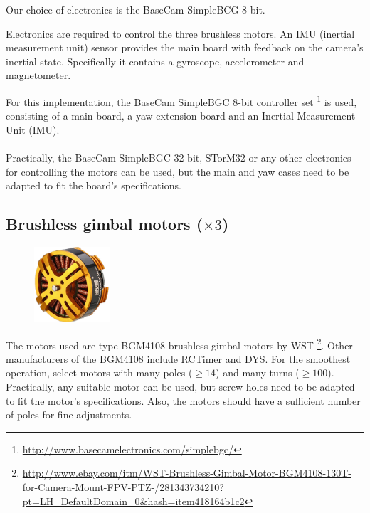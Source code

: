 Our choice of electronics is the BaseCam SimpleBCG 8-bit.

Electronics are required to control the three brushless motors. An IMU (inertial measurement unit) sensor provides the main board with feedback on the camera’s inertial state. Specifically it contains a gyroscope, accelerometer and magnetometer.

For this implementation, the BaseCam SimpleBGC 8-bit controller set \footnote{\url{http://www.basecamelectronics.com/simplebgc/}} is used, consisting of a main board, a yaw extension board and an Inertial Measurement Unit (IMU).\\\\

\raisebox{-0.2cm}{\hspace{-1.5cm}\Huge\Info}\normalsize \quad Practically, the BaseCam SimpleBGC 32-bit, STorM32 or any other electronics for controlling the motors can be used, but the main and yaw cases need to be adapted to fit the board’s specifications.\\

\subsection{Brushless gimbal motors ($\times3$)}

\begin{figure}
    \vspace{-1.5cm}
    \includegraphics[width=0.25\textwidth]{ThirdParts/Motor.png}
\end{figure}

The motors used are type BGM4108 brushless gimbal motors by WST \footnote{\url{http://www.ebay.com/itm/WST-Brushless-Gimbal-Motor-BGM4108-130T-for-Camera-Mount-FPV-PTZ-/281343734210?pt=LH_DefaultDomain_0&hash=item418164b1c2}}. Other manufacturers of the BGM4108 include RCTimer and DYS. For the smoothest operation, select motors with many poles ($\geq14$) and many turns ($\geq100$).\\

\raisebox{-0.2cm}{\hspace{-1.5cm}\Huge\Info}\normalsize \quad Practically, any suitable motor can be used, but screw holes need to be adapted to fit the motor’s specifications. Also, the motors should have a sufficient number of poles for fine adjustments.\\


